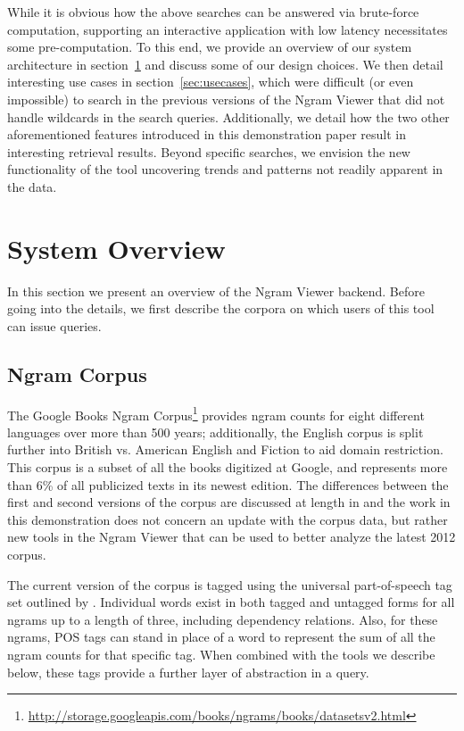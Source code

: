 \documentclass[11pt]{article}
\begin{document}
While it is obvious how the above searches can be answered via brute-force computation, supporting an interactive application with low latency necessitates some pre-computation. To this end, we provide an overview of our system architecture in section~\ref{sec:overview} and discuss some of our design choices. We then detail interesting use cases in section~\ref{sec:usecases}, which were difficult (or even impossible) to search in the previous versions of the Ngram Viewer that did not handle wildcards in the search queries. Additionally, we detail how the two other aforementioned features introduced in this demonstration paper result in interesting retrieval results. Beyond specific searches, we envision the new functionality of the tool uncovering trends and patterns not readily apparent in the data.

\section{System Overview}
\label{sec:overview}

In this section we present an overview of the Ngram Viewer backend. Before going into the details, we first describe the corpora on which users of this tool can issue queries.

\subsection{Ngram Corpus}
	The Google Books Ngram Corpus\footnote{\url{http://storage.googleapis.com/books/ngrams/books/datasetsv2.html}} provides ngram counts for eight different languages over more than 500 years; additionally, the English corpus is split further into British vs. American English and Fiction to aid domain restriction. This corpus is a subset of all the books digitized at Google, and represents more than 6\%\cite{lin2012syntactic} of all publicized texts in its newest edition. The differences between the first and second versions of the corpus are discussed at length in  and the work in this demonstration does not concern an update with the corpus data, but rather new tools in the Ngram Viewer that can be used to better analyze the latest 2012 corpus.
	
The current version of the corpus is tagged using the universal part-of-speech tag set outlined by . Individual words exist in both tagged and untagged forms for all ngrams up to a length of three, including dependency relations. Also, for these ngrams, POS tags can stand in place of a word to represent the sum of all the ngram counts for that specific tag. When combined with the tools we describe below, these tags provide a further layer of abstraction in a query.
\vspace{2.5em}
\end{document}
